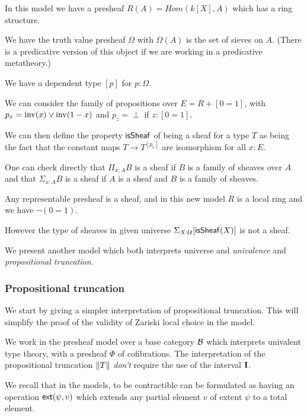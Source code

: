 \medskip

    In this model we have a presheaf $R(A) = Hom(k[X],A)$ which has a ring structure.

    We have the truth value presheaf $\Omega$ with $\Omega(A)$ is the set of sieves on $A$.
    (There is a predicative version of this object if we are working in a predicative metatheory.)

    We have a dependent type $[p]$ for $p:\Omega$.

    We can consider the family of propositions over $E = R + [0=1]$, with $p_x = \mathrm{inv}(x)\vee\mathrm{inv}(1-x)$
    and $p_z = \perp$ if $z:[0=1]$.

    We can then define the property $\mathsf{isSheaf}$ of being a sheaf for a type $T$ as being the fact that
    the constant maps $T\rightarrow T^{[p_x]}$ are isomorphism for all $x:E$.

    \medskip

    One can check directly that $\Pi_{x:A}B$ is a sheaf if $B$ is a family of sheaves over $A$
    and that $\Sigma_{x:A}B$ is a sheaf if $A$ is a sheaf and $B$ is a family of sheaves.

    \medskip

    Any representable presheaf is a sheaf, and in this new model $R$ is a local ring and we have
    $\neg (0 = 1)$.
    
    \medskip

    However the type of sheaves in given universe $\Sigma_{X:\mathcal{U}}[\mathsf{isSheaf}(X)]$ is not a sheaf.

    We present another model which both interprets universe and {\em univalence} and
    {\em propositional truncation}.


\subsubsection{Propositional truncation}

    We start by giving a simpler interpretation of propositional truncation. This will simplify
    the proof of the validity of Zariski local choice in the model.

    We work in the presheaf model over a base category $\mathcal{B}$ which interprets univalent type theory,
    with a presheaf $\Phi$ of cofibrations. The interpretation of the propositional
    truncation $\left\lVert T \right\rVert$ {\em don't} require the use of the interval $\mathbf{I}$.

    We recall that in the models, to be contractible can be formulated as having an operation
    $\mathsf{ext}(\psi,v)$ which extends any partial element $v$ of extent $\psi$ to a total element.

